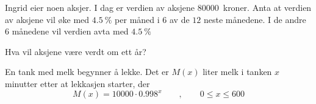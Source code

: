 %



\Oppgave[2] 

Ingrid eier noen aksjer. I dag er verdien av aksjene $\num{80000}$~kroner. Anta
at verdien av aksjene vil øke med $\SI{4.5}{\percent}$ per måned i $6$ av de
$12$ neste månedene. I de andre $6$ månedene vil verdien avta med
$\SI{4.5}{\percent}$ \bigskip

Hva vil aksjene være verdt om ett år?


\Oppgave[9]

En tank med melk begynner å lekke. Det er $M(x)$ liter melk i tanken  $x$
minutter etter at lekkasjen starter, der
%
\begin{equation*}
  M(x) = \num{10000} \cdot \num{0.998}^x
  \qquad , \qquad
  0 \leq x \leq 600
\end{equation*}

